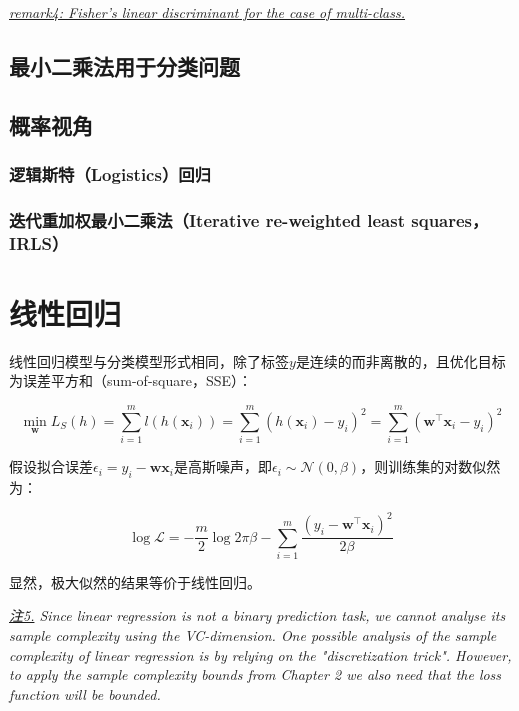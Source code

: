 \documentclass{article}
\begin{document}
	\begin{scriptsize}
	\begin{spacing}{1.2}
	{\sffamily \textit{\underline{remark4: Fisher's linear discriminant for the case of multi-class.}}}
	\end{spacing}
	\end{scriptsize}
	
	\subsection{最小二乘法用于分类问题}
	
	\subsection{概率视角}
	
	\subsubsection{逻辑斯特（Logistics）回归}
	
	\subsubsection{迭代重加权最小二乘法（Iterative re-weighted least squares，IRLS）}

\section{线性回归}

	线性回归模型与分类模型形式相同，除了标签$y$是连续的而非离散的，且优化目标为误差平方和（sum-of-square，SSE）：

	\begin{equation}
	\min_\mathbf{w} L_S(h) =\sum_{i=1}^m  l(h(\mathbf{x}_i)) = \sum_{i=1}^m (h(\mathbf{x}_i) - y_i)^2 = \sum_{i=1}^m (\mathbf{w}^\top\mathbf{x}_i - y_i)^2 
	\end{equation}

	假设拟合误差$\epsilon_i = y_i-\mathbf{wx}_i$是高斯噪声，即$\epsilon_i \sim\mathcal{N}(0,\beta)$，则训练集的对数似然为：
	
	\begin{equation}
	\log \mathcal{L} = -\frac{m}{2} \log 2\pi\beta - \sum_{i=1}^m \frac{(y_i-\mathbf{w}^\top\mathbf{x}_i)^2}{2\beta}
	\end{equation}

显然，极大似然的结果等价于线性回归。

	\vspace{2mm}
	\begin{scriptsize}
	\begin{spacing}{1.2}
	{\sffamily
	\noindent \textit{\underline{注5.} Since linear regression is not a binary prediction task, we cannot analyse its sample complexity using the VC-dimension. One possible analysis of the sample complexity of linear regression is by relying on the "discretization trick". However, to apply the sample complexity bounds from Chapter 2 we also need that the loss function will be bounded.}}
	\end{spacing}
	\end{scriptsize}
	\vspace{-2mm}
	
\end{document}
